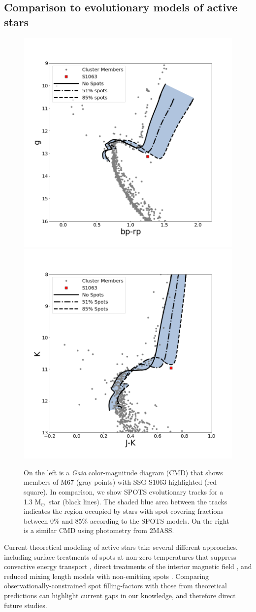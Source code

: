 \documentclass[trackchanges]{aastex631}
\newcommand{\Msolar}{M$_{\odot}$}
\begin{document}
 \subsection{Comparison to evolutionary models of active stars}
 \label{sec:model_comparison}

\begin{figure}[ht]
    \centering
    \includegraphics[width=0.45\linewidth]{figures/S1063_GaiaCMD.png}
    \includegraphics[width=0.45\linewidth]{figures/S1063_2MASS_CMD.png}
    \caption{On the left is a \textit{Gaia} color-magnitude diagram (CMD) that shows members of M67 (gray points) with SSG S1063 highlighted (red square). In comparison, we show SPOTS evolutionary tracks \citep{somers20} for a 1.3 \Msolar\ star (black lines). The shaded blue area between the tracks indicates the region occupied by stars with spot covering fractions between 0\% and 85\% according to the SPOTS models. On the right is a similar CMD using photometry from 2MASS.}
    \label{fig:CMDs}
\end{figure}

Current theoretical modeling of active stars take several different approaches, including surface treatments of spots at non-zero temperatures that suppress convective energy transport \citep{somers20}, direct treatments of the interior magnetic field \citep{2013ApJ...779..183F}, and reduced mixing length models with non-emitting spots \citep{2007A&A...472L..17C}. Comparing observationally-constrained spot filling-factors with those from theoretical predictions can highlight current gaps in our knowledge, and therefore direct future studies.
\end{document}
